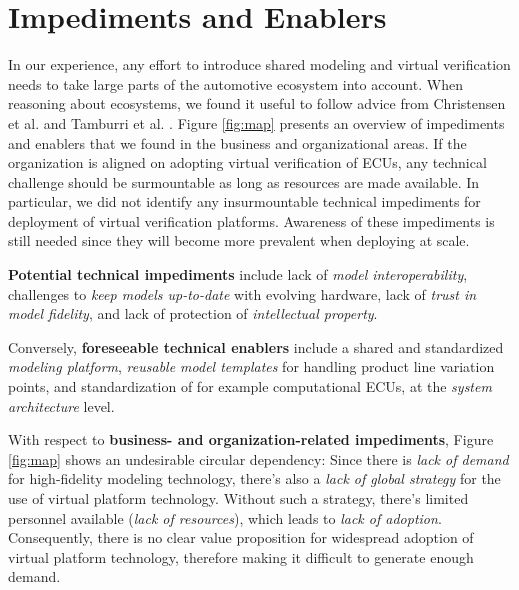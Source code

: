 \section{Impediments and Enablers}\label{sec:impediments_and_enablers}
In our experience, any effort to introduce shared modeling and virtual verification needs to take large parts of the automotive ecosystem into account. 
When reasoning about ecosystems, we found it useful to follow advice from Christensen et al. and Tamburri et al.  \cite{christensen2014analysis,tamburri2013uncovering}. 
Figure \ref{fig:map}  presents an overview of impediments and enablers that we found in the business and organizational areas.
If the organization is aligned on adopting virtual verification of ECUs,
any technical challenge should be surmountable as long as resources are made available.
In particular, we did not identify any insurmountable technical impediments for deployment of virtual verification platforms.
Awareness of these impediments is still needed since they will become more prevalent when deploying at scale.

\textbf{Potential technical impediments} include
lack of \emph{model interoperability},
challenges to \emph{keep models up-to-date} with evolving hardware,
lack of \emph{trust in model fidelity},
and lack of protection of \emph{intellectual property}.

Conversely, \textbf{foreseeable technical enablers} include a shared and standardized \emph{modeling platform},
\emph{reusable model templates} for handling product line variation points,
and standardization of for example computational ECUs, at the \emph{system architecture} level.



With respect to \textbf{business- and organization-related impediments}, Figure \ref{fig:map} shows an undesirable circular dependency:
Since there is \emph{lack of demand} for high-fidelity modeling technology,
there's also a \emph{lack of global strategy} for the use of virtual platform technology.
Without such a strategy, there's limited personnel available (\emph{lack of resources}),
which leads to \emph{lack of adoption}.
Consequently, there is no clear value proposition for widespread adoption of virtual platform technology, therefore making it difficult to generate enough demand.


